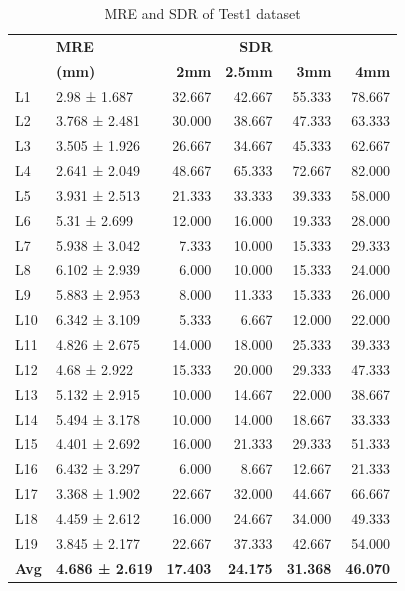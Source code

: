 \documentclass[sn-mathphys]{sn-jnl}%
\theoremstyle{thmstyleone}%
\theoremstyle{thmstyletwo}%
\theoremstyle{thmstylethree}%
\begin{document}
 
 

\begin{table}[ht!]
\centering
\begin{tabular}{llrrrr}
\toprule
&                \textbf{MRE}         &            &  \textbf{SDR} &\\
    &             \textbf{(mm)}&       \textbf{2mm} &       \textbf{2.5mm} &       \textbf{3mm}&       \textbf{4mm} \\
\midrule
 
 L1 &   2.98 ± 1.687 &  32.667 &  42.667 &  55.333 &  78.667 \\
  L2 &  3.768 ± 2.481 &  30.000 &  38.667 &  47.333 &  63.333 \\
  L3 &  3.505 ± 1.926 &  26.667 &  34.667 &  45.333 &  62.667 \\
  L4 &  2.641 ± 2.049 &  48.667 &  65.333 &  72.667 &  82.000 \\
  L5 &  3.931 ± 2.513 &  21.333 &  33.333 &  39.333 &  58.000 \\
  L6 &   5.31 ± 2.699 &  12.000 &  16.000 &  19.333 &  28.000 \\
  L7 &  5.938 ± 3.042 &   7.333 &  10.000 &  15.333 &  29.333 \\
  L8 &  6.102 ± 2.939 &   6.000 &  10.000 &  15.333 &  24.000 \\
  L9 &  5.883 ± 2.953 &   8.000 &  11.333 &  15.333 &  26.000 \\
 L10 &  6.342 ± 3.109 &   5.333 &   6.667 &  12.000 &  22.000 \\
 L11 &  4.826 ± 2.675 &  14.000 &  18.000 &  25.333 &  39.333 \\
 L12 &   4.68 ± 2.922 &  15.333 &  20.000 &  29.333 &  47.333 \\
 L13 &  5.132 ± 2.915 &  10.000 &  14.667 &  22.000 &  38.667 \\
 L14 &  5.494 ± 3.178 &  10.000 &  14.000 &  18.667 &  33.333 \\
 L15 &  4.401 ± 2.692 &  16.000 &  21.333 &  29.333 &  51.333 \\
 L16 &  6.432 ± 3.297 &   6.000 &   8.667 &  12.667 &  21.333 \\
 L17 &  3.368 ± 1.902 &  22.667 &  32.000 &  44.667 &  66.667 \\
 L18 &  4.459 ± 2.612 &  16.000 &  24.667 &  34.000 &  49.333 \\
 L19 &  3.845 ± 2.177 &  22.667 &  37.333 &  42.667 &  54.000 \\
 \textbf{Avg} &        \textbf{4.686 ± 2.619} &  \textbf{17.403} &  \textbf{24.175} &  \textbf{31.368} &  \textbf{46.070} \\
\bottomrule
\end{tabular}
\caption{MRE and SDR of Test1 dataset}
\label{table:5.1}
\end{table}
\end{document}
